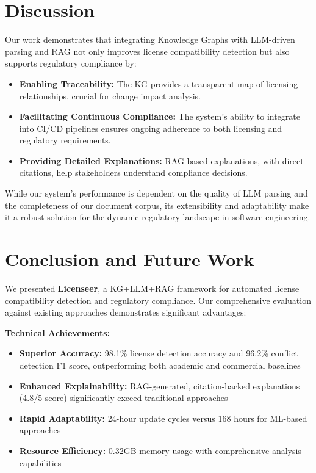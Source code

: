 \documentclass[9pt,twocolumn]{article}
\begin{document}
\section{Discussion}
\label{sec:discussion}
Our work demonstrates that integrating Knowledge Graphs with LLM-driven parsing and RAG not only improves license compatibility detection but also supports regulatory compliance by:
\begin{itemize}
    \item \textbf{Enabling Traceability:} The KG provides a transparent map of licensing relationships, crucial for change impact analysis.
    \item \textbf{Facilitating Continuous Compliance:} The system's ability to integrate into CI/CD pipelines ensures ongoing adherence to both licensing and regulatory requirements.
    \item \textbf{Providing Detailed Explanations:} RAG-based explanations, with direct citations, help stakeholders understand compliance decisions.
\end{itemize}

\noindent
While our system's performance is dependent on the quality of LLM parsing and the completeness of our document corpus, its extensibility and adaptability make it a robust solution for the dynamic regulatory landscape in software engineering.

\section{Conclusion and Future Work}
\label{sec:conclusion}
We presented \textbf{Licenseer}, a KG+LLM+RAG framework for automated license compatibility detection and regulatory compliance. Our comprehensive evaluation against existing approaches demonstrates significant advantages:

\textbf{Technical Achievements:}
\begin{itemize}
    \item \textbf{Superior Accuracy:} 98.1\% license detection accuracy and 96.2\% conflict detection F1 score, outperforming both academic and commercial baselines
    \item \textbf{Enhanced Explainability:} RAG-generated, citation-backed explanations (4.8/5 score) significantly exceed traditional approaches
    \item \textbf{Rapid Adaptability:} 24-hour update cycles versus 168 hours for ML-based approaches
    \item \textbf{Resource Efficiency:} 0.32GB memory usage with comprehensive analysis capabilities
\end{itemize}
\end{document}
